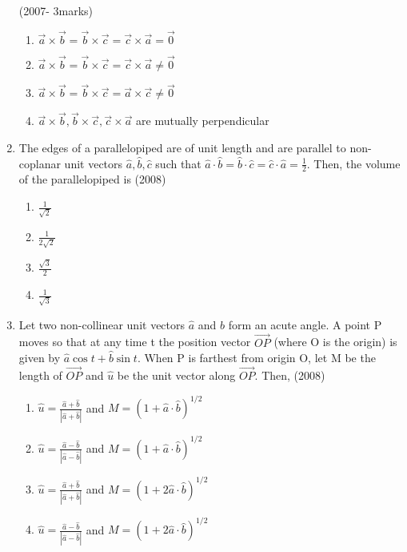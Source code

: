 \documentclass[journal,12pt,twocolumn]{IEEEtran}
\theoremstyle{remark}
\begin{document}
\begin{enumerate}
    \hfill{(2007- 3marks)}
    \begin{enumerate}[label=(\alph*)]
    \item $\vec{a} \times \vec{b} = \vec{b} \times \vec{c} = \vec{c} \times \vec{a} = \vec{0}$
    \item $\vec{a} \times \vec{b} = \vec{b} \times \vec{c} = \vec{c} \times \vec{a} \neq \vec{0}$
    \item $\vec{a} \times \vec{b} = \vec{b} \times \vec{c} = \vec{a} \times \vec{c} \neq \vec{0}$
    \item $\vec{a} \times \vec{b}, \vec{b} \times \vec{c}, \vec{c} \times \vec{a}$ are mutually perpendicular
    \end{enumerate}
    \item The edges of a parallelopiped are of unit length and are parallel to non-coplanar unit vectors $\hat{a},\hat{b},\hat{c}$ such that $\hat{a} \cdot \hat{b}= \hat{b} \cdot \hat{c}= \hat{c} \cdot \hat{a}= \frac{1}{2}$. Then, the volume of the parallelopiped is 
    \hfill{(2008)}
    \begin{enumerate}[label=(\alph*)]
    \item $\frac{1}{\sqrt{2}}$
    \item $\frac{1}{2\sqrt{2}}$
    \item $\frac{\sqrt{3}}{2}$
    \item $\frac{1}{\sqrt{3}}$
    \end{enumerate}
    \item Let two non-collinear unit vectors $\hat{a}$ and $\hat{b}$ form an acute angle. A point P moves so that at any time t the position vector $\overrightarrow{OP}$ (where O is the origin) is given by $\hat{a}\cos{t} + \hat{b}\sin{t}$. When P is farthest from origin O, let M be the length of $\overrightarrow{OP}$ and $\hat{u}$ be the unit vector along $\overrightarrow{OP}$. Then,
    \hfill{(2008)}
    \begin{enumerate}[label=(\alph*)]
    \item $\hat{u} = \frac{\hat{a}+\hat{b}}{|\hat{a}+\hat{b}|}$  and $M = (1+\hat{a} \cdot \hat{b})^{1/2}$
    \item $\hat{u} = \frac{\hat{a}-\hat{b}}{|\hat{a}-\hat{b}|}$  and $M = (1+\hat{a} \cdot \hat{b})^{1/2}$
    \item $\hat{u} = \frac{\hat{a}+\hat{b}}{|\hat{a}+\hat{b}|}$  and $M = (1+2\hat{a} \cdot \hat{b})^{1/2}$
    \item $\hat{u} = \frac{\hat{a}-\hat{b}}{|\hat{a}-\hat{b}|}$  and $M = (1+2\hat{a} \cdot \hat{b})^{1/2}$
    \end{enumerate}

\end{enumerate}
\end{document}
